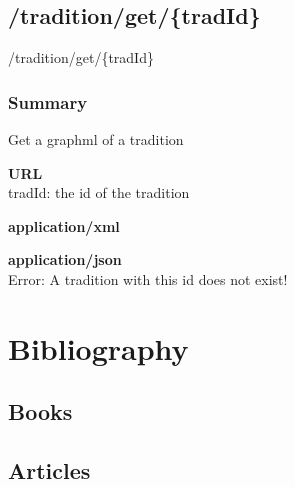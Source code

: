\documentclass[11pt,fleqn,openany]{book} %
\begin{document}
\section{/tradition/get/\{tradId\}}
\begin{get}
/tradition/get/\{tradId\}
\end{get}

\subsection*{Summary}
Get a graphml of a tradition
\begin{parameter}\textbf{URL}\\
tradId: the id of the tradition \\
\end{parameter}
\begin{return}[OK]
\textbf{application/xml}\\

\end{return}
\begin{return}
\textbf{application/json}\\
Error: A tradition with this id does not exist!
\end{return}


\chapter*{Bibliography}
\section*{Books}
\printbibliography[heading=bibempty,type=book]
\section*{Articles}
\printbibliography[heading=bibempty,type=article]


\cleardoublepage
{}
\setlength{\columnsep}{0.75cm}
\printindex

\end{document}
